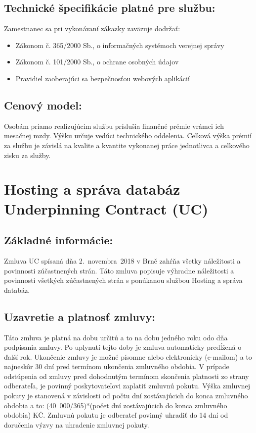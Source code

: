 \documentclass[a4paper, 11pt]{article}
\begin{document}
\begin{center}
\subsection*{Technické špecifikácie platné pre službu:}
Zamestnanec sa pri vykonávaní zákazky zaväzuje dodržať:
\begin{itemize}
\item Zákonom č. 365/2000 Sb., o informačných systémoch verejnej správy
\item Zákonom č. 101/2000 Sb., o ochrane osobných údajov
\item Pravidiel zaoberajúci sa bezpečnosťou webových aplikácií
\end{itemize}

\subsection*{Cenový model:}
Osobám priamo realizujúcim službu príslušia finančné prémie vrámci ich mesačnej mzdy. Výšku určuje vedúci technického oddelenia. Celková výška prémií za službu je závislá na kvalite a kvantite vykonanej práce jednotlivca a celkového zisku za služby.

\hfill
\section*{ \Large Hosting a správa databáz \\ Underpinning Contract (UC)}
\hfill
\subsection*{Základné informácie:}
Zmluva UC spísaná dňa 2.~novembra~2018 v Brně zahŕňa všetky náležitosti a povinnosti zúčastnených strán. Táto zmluva popisuje výhradne náležitosti a povinnosti všetkých zúčastnených strán s ponúkanou službou Hosting a správa databáz.

\subsection*{Uzavretie a platnosť zmluvy:}
Táto zmluva je platná na dobu určitú a to na dobu jedného roku odo dňa podpísania zmluvy. Po uplynutí tejto doby je zmluva automaticky predĺžená o ďalší rok. Ukončenie zmluvy je možné písomne alebo elektronicky (e-mailom) a to najneskôr 30 dní pred termínom ukončenia zmluvného obdobia. V prípade odstúpenia od zmluvy pred dohodnutým termínom skončenia platnosti zo strany odberateľa, je povinný poskytovateľovi zaplatiť zmluvnú pokutu. Výška zmluvnej pokuty je stanovená v závislosti od počtu dní zostávajúcich do konca zmluvného obdobia a to: (40~000/365)*(počet dní zostávajúcich do konca zmluvného obdobia) KČ. Zmluvnú pokutu je odberateľ povinný uhradiť do 14 dní od doručenia výzvy na uhradenie zmluvnej pokuty.


\end{center}
\end{document}
